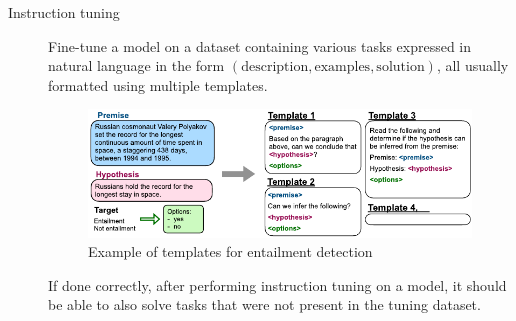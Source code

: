 \begin{description}
    \item[Instruction tuning] 
        Fine-tune a model on a dataset containing various tasks expressed in natural language in the form $(\text{description}, \text{examples}, \text{solution})$, all usually formatted using multiple templates.

        \begin{figure}[H]
            \centering
            \includegraphics[width=0.7\linewidth]{./img/_instruction_tuning.pdf}
            \caption{Example of templates for entailment detection}
        \end{figure}

        \begin{remark}
            If done correctly, after performing instruction tuning on a model, it should be able to also solve tasks that were not present in the tuning dataset.
        \end{remark}


\end{description}
